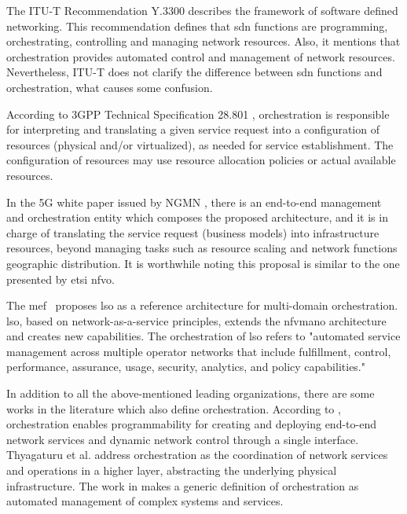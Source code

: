 The ITU-T Recommendation Y.3300 \cite{InternationalTelecommunicationUnion2014ITU-TNetworking} describes the framework of software defined networking. This recommendation defines that \gls{sdn} functions are programming, orchestrating, controlling and managing network resources. Also, it mentions that orchestration provides automated control and management of network resources. Nevertheless, ITU-T does not clarify the difference between \gls{sdn} functions and orchestration, what causes some confusion.

According to 3GPP Technical Specification 28.801 \cite{3GPP2017TRNetwork}, orchestration is responsible for interpreting and translating a given service request into a configuration of resources (physical and/or virtualized), as needed for service establishment. The configuration of resources may use resource allocation policies or actual available resources. %

In the 5G white paper issued by NGMN \cite{NGMNAlliance2015NGMNPaper}, there is an end-to-end management and orchestration entity which composes the proposed architecture, and it is in charge of translating the service request (business models) into infrastructure resources, beyond managing tasks such as resource scaling and network functions geographic distribution. It is worthwhile noting this proposal is similar to the one presented by \gls{etsi} \gls{nfvo}.  

The \gls{mef}~\cite{MEF:Third:2015} proposes \gls{lso} as a reference architecture for multi-domain orchestration. \gls{lso}, based on network-as-a-service principles, extends the \gls{nfvmano} architecture and creates new capabilities. The orchestration of \gls{lso} refers to "automated service management across multiple operator networks that include fulfillment, control, performance, assurance, usage, security, analytics, and policy capabilities."

In addition to all the above-mentioned leading organizations, there are some works in the literature which also define orchestration. According to \cite{Rostami2016Multi-Domain5G}, orchestration enables programmability for creating and deploying end-to-end network services and dynamic network control through a single interface. Thyagaturu et al. \cite{Thyagaturu2016SoftwareSurvey} address orchestration as the coordination of network services and operations in a higher layer, abstracting the underlying physical infrastructure. The work in \cite{Guerzoni2016Multi-domainApproach} makes a generic definition of orchestration as automated management of complex systems and services.

